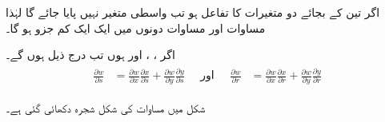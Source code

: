 اگر  تین کے بجائے دو متغیرات کا تفاعل ہو تب واسطی متغیر  نہیں پایا جائے گا لہٰذا   مساوات  اور مساوات  دونوں  میں ایک ایک کم  جزو  ہو گا۔

اگر ،  ، اور  ہوں تب درج ذیل ہوں گے۔
\begin{gather}
\begin{aligned}\label{مساوات_کثیرالمتغیر_دو_غیر_تابع_تین_درمیانے_متغیر_پ}
\frac{\partial w}{\partial s}&=\frac{\partial w}{\partial x}\frac{\partial x}{\partial s}+\frac{\partial w}{\partial y}\frac{\partial y}{\partial s}
\end{aligned}\quad\text{اور}\quad
\begin{aligned}
\frac{\partial w}{\partial r}&=\frac{\partial w}{\partial x}\frac{\partial x}{\partial r}+\frac{\partial w}{\partial y}\frac{\partial y}{\partial r}
\end{aligned}
\end{gather}

  شکل    میں  مساوات  کی  شکل شجرہ  دکھائی  گئی  ہے۔

